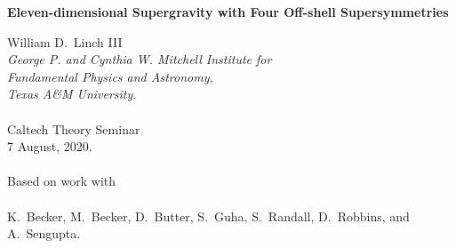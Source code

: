 \documentclass[letter,12pt]{article} %
\begin{document}



\vspace{10mm}
\begin{center}
\Large \textbf {
Eleven-dimensional Supergravity with Four Off-shell Supersymmetries
}
\end{center} 
\vspace{5mm}
\begin{center} 
{
William D.\ Linch III
}
\\[5mm]
{
{\em George P. and Cynthia W. Mitchell Institute for\\
Fundamental Physics and Astronomy, \\
Texas A\&{}M University.}\\
~\\
Caltech Theory Seminar\\
7 August, 2020.\\
~\\
Based on work 
with \\
~\\
K.\ Becker, 
M.\ Becker, 
D.\ Butter, 
S.\ Guha, 
S.\ Randall, 
D.\ Robbins,
and
A.\ Sengupta.
}
\end{center} 

\vspace{10pt}


\begin{abstract}
Off-shell supersymmetry of higher-derivative corrections to 2-derivative actions generally leads to an infinite set of ever-higher-derivative corrections. In some cases, the result is a potentially large part of an effective action for some more fundamental theory. While it is generally expected to be impossible to describe more than eight {\color{red} twelve?} Poincar\'e supersymmetries this way, some constructions may be simplified considerably even if only a fraction of them closes off-shell. In this talk, I will describe eleven-dimensional supergravity with four of the 32 supersymmetries manifest and the status of a project to construct the famous $\int C\wedge X_8$ invariant.
\end{abstract}
\end{document}
